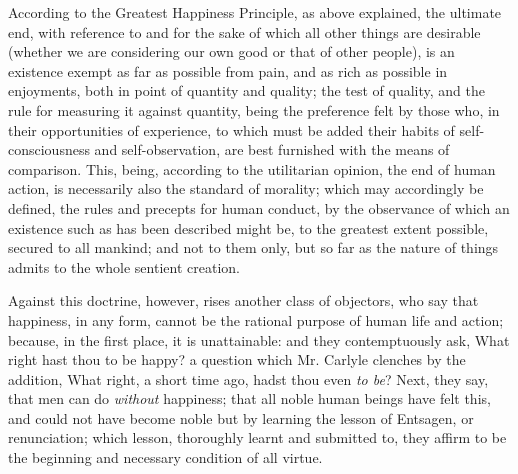 According to the Greatest Happiness Principle, as above
explained, the ultimate end, with reference to and for the sake of
which all other things are desirable (wheth\-er we are considering our
own good or that of other people), is an existence exempt as far as
possible from pain, and as rich as possible in enjoyments, both in
point of quantity and quality; the test of quality, and the rule for
measuring it against quantity, being the preference felt by those who,
in their opportunities of experience, to which must be added their
habits of self-consciousness and self-observation, are best furnished
with the means of comparison. This, being, according to the
utilitarian opinion, the end of human action, is necessarily also the
standard of morality; which may accordingly be defined, the rules and
precepts for human conduct, by the observance of which an existence
such as has been described might be, to the greatest extent possible,
secured to all mankind; and not to them only, but so far as the nature
of things admits to the whole sentient creation.

Against this doctrine, however, rises another class of objectors, who
say that happiness, in any form, cannot be the rational purpose of
human life and action; because, in the first place, it is
unattainable: and they contemptuously ask, What right hast thou to be
happy? a question which Mr. Carlyle clenches by the addition, What
right, a short time ago, hadst thou even \textit{to be}? Next, they
say, that men can do \textit{without} happiness; that all noble human
beings have felt this, and could not have become noble but by learning
the lesson of Entsagen, or renunciation; which lesson, thoroughly
learnt and  submitted to, they affirm to be the beginning and
necessary condition of all virtue.

